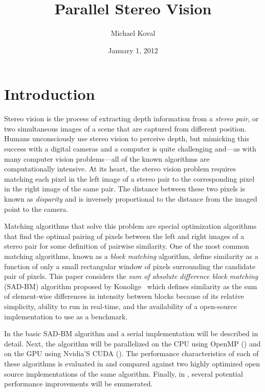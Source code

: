 \documentclass{article}
\title{Parallel Stereo Vision}
\author{Michael Koval}
\date{January 1, 2012}
\begin{document}
\maketitle

\section{Introduction}
\label{sec:intro}
Stereo vision is the process of extracting depth information from a
\textit{stereo pair}, or two simultaneous images of a scene that are captured
from different position. Humans unconsciously use stereo vision to perceive
depth, but mimicking this success with a digital cameras and a computer is
quite challenging and---as with many computer vision problems---all of the
known algorithms are computationally intensive. At its heart, the stereo vision
problem requires matching each pixel in the left image of a stereo pair to the
corresponding pixel in the right image of the same pair. The distance between
these two pixels is known as \textit{disparity} and is inversely proportional
to the distance from the imaged point to the camera.

Matching algorithms that solve this problem are special optimization algorithms
that find the optimal pairing of pixels between the left and right images of a
stereo pair for some definition of pairwise similarity. One of the most common
matching algorithms, known as a \textit{block matching} algorithm, define
similarity as a function of only a small rectangular window of pixels
surrounding the candidate pair of pixels. This paper considers the \textit{sum
of absolute difference block matching} (SAD-BM) algorithm proposed by
Konolige~\cite{konolige97} which defines similarity as the sum of element-wise
differences in intensity between blocks because of its relative simplicity,
ability to run in real-time, and the availability of a open-source
implementation to use as a benchmark.

In  the basic SAD-BM algorithm and a serial implementation
will be described in detail. Next, the algorithm will be parallelized on the
CPU using OpenMP () and on the GPU using Nvidia'S
CUDA (). The performance characteristics of each of
these algorithms is evaluated in  and compared against two
highly optimized open source implementations of the same algorithm. Finally, in
, several potential performance improvements will be
enumerated.
\end{document}
